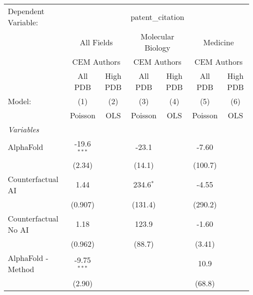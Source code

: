 \begingroup
\centering
\begin{tabular}{lcccccc}
   \tabularnewline \midrule \midrule
   Dependent Variable: & \multicolumn{6}{c}{patent\_citation}\\
 & \multicolumn{2}{c}{All Fields} & \multicolumn{2}{c}{Molecular Biology} & \multicolumn{2}{c}{Medicine} \\
\cmidrule(lr){2-3} \cmidrule(lr){4-5} \cmidrule(lr){6-7}
 & \multicolumn{2}{c}{CEM Authors} & \multicolumn{2}{c}{CEM Authors} & \multicolumn{2}{c}{CEM Authors} \\
\cmidrule(lr){2-3} \cmidrule(lr){4-5} \cmidrule(lr){6-7}
 & \multicolumn{1}{c}{All PDB} & \multicolumn{1}{c}{High PDB} & \multicolumn{1}{c}{All PDB} & \multicolumn{1}{c}{High PDB} & \multicolumn{1}{c}{All PDB} & \multicolumn{1}{c}{High PDB} \\
\cmidrule(lr){2-2} \cmidrule(lr){3-3} \cmidrule(lr){4-4} \cmidrule(lr){5-5} \cmidrule(lr){6-6} \cmidrule(lr){7-7}
   Model:                                                     & (1)           & (2)  & (3)         & (4)  & (5)     & (6)\\  
                                                              &  Poisson      & OLS  & Poisson     & OLS  & Poisson & OLS\\  
   \midrule
   \emph{Variables}\\
   AlphaFold                                                  & -19.6$^{***}$ &      & -23.1       &      & -7.60   &   \\   
                                                              & (2.34)        &      & (14.1)      &      & (100.7) &   \\   
   Counterfactual AI                                          & 1.44          &      & 234.6$^{*}$ &      & -4.55   &   \\   
                                                              & (0.907)       &      & (131.4)     &      & (290.2) &   \\   
   Counterfactual No AI                                       & 1.18          &      & 123.9       &      & -1.60   &   \\   
                                                              & (0.962)       &      & (88.7)      &      & (3.41)  &   \\   
   AlphaFold - Method                                         & -9.75$^{***}$ &      &             &      & 10.9    &   \\   
                                                              & (2.90)        &      &             &      & (68.8)  &   \\   

\end{tabular}
